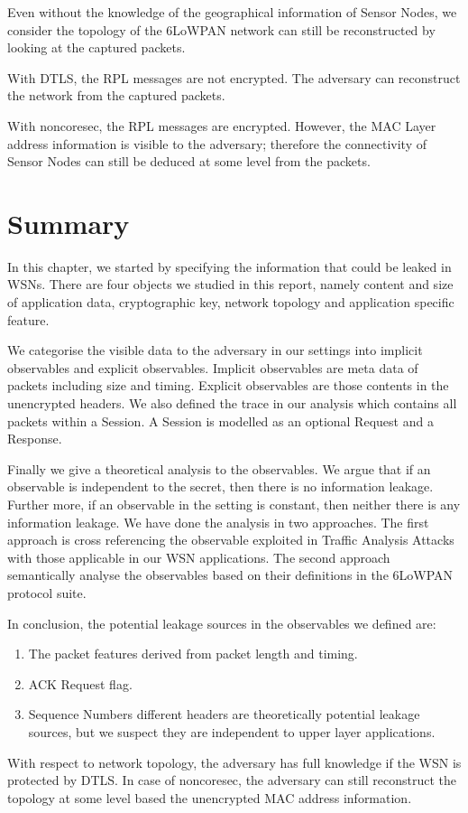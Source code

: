 Even without the knowledge of the geographical information of Sensor Nodes, we consider the topology of the 6LoWPAN network can still be reconstructed by looking at the captured packets.

\begin{description}[style=nextline]
	\item With DTLS, the RPL messages are not encrypted. The adversary can reconstruct the network from the captured packets.
	\item With noncoresec, the RPL messages are encrypted. However, the MAC Layer address information is visible to the adversary; therefore the connectivity of Sensor Nodes can still be deduced at some level from the packets.
\end{description}

\section{Summary}

In this chapter, we started by specifying the information that could be leaked in WSNs. There are four objects we studied in this report, namely content and size of application data, cryptographic key, network topology and application specific feature.

We categorise the visible data to the adversary in our settings into implicit observables and explicit observables. Implicit observables are meta data of packets including size and timing. Explicit observables are those contents in the unencrypted headers. We also defined the trace in our analysis which contains all packets within a Session. A Session is modelled as an optional Request and a Response.

Finally we give a theoretical analysis to the observables. We argue that if an observable is independent to the secret, then there is no information leakage. Further more, if an observable in the setting is constant, then neither there is any information leakage. We have done the analysis in two approaches. The first approach is cross referencing the observable exploited in Traffic Analysis Attacks with those applicable in our WSN applications. The second approach semantically analyse the observables based on their definitions in the 6LoWPAN protocol suite. 

In conclusion, the potential leakage sources in the observables we defined are:

\begin{enumerate}
	\item The packet features derived from packet length and timing.
	\item ACK Request flag.
	\item Sequence Numbers different headers are theoretically potential leakage sources, but we suspect they are independent to upper layer applications.
\end{enumerate}

With respect to network topology, the adversary has full knowledge if the WSN is protected by DTLS. In case of noncoresec, the adversary can still reconstruct the topology at some level based the unencrypted MAC address information. 